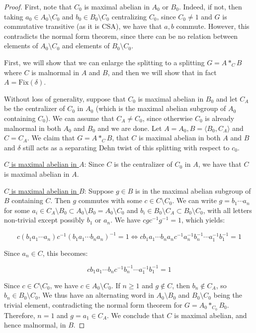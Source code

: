 \documentclass{amsart}
\newcommand{\vs}{\vspace{10pt}}
\theoremstyle{plain}
\theoremstyle{definition}
\theoremstyle{remark}
\begin{document}
\begin{proof}
    First, note that $C_0$ is maximal abelian in $A_0$ or $B_0$. Indeed, if not, then taking $a_0 \in A_0 \setminus C_0$ and $b_0 \in B_0 \setminus C_0$ centralizing $C_0$, since $C_0 \neq 1$ and $G$ is commutative transitive (as it is CSA), we have that $a,b$ commute. However, this contradicts the normal form theorem, since there can be no relation between elements of $A_0 \setminus C_0$ and elements of $B_0 \setminus C_0$. 

    First, we will show that we can enlarge the splitting to a splitting $G = A *_C B$ where $C$ is malnormal in $A$ and $B$, and then we will show that in fact $A = \mathrm{Fix}(\delta)$. 

    Without loss of generality, suppose that $C_0$ is maximal abelian in $B_0$ and let $C_A$ be the centralizer of $C_0$ in $A_0$ (which is the maximal abelian subgroup of $A_0$ containing $C_0$). We can assume that $C_A \neq C_0$, since otherwise $C_0$ is already malnormal in both $A_0$ and $B_0$ and we are done. Let $A = A_0, B = \langle B_0, C_A \rangle$ and $C = C_A$. We claim that $G = A *_C B$, that $C$ is maximal abelian in both $A$ and $B$ and $\delta$ still acts as a separating Dehn twist of this splitting with respect to $c_0$. 

\vs

\underline{$C$ is maximal abelian in $A$}: Since $C$ is the centralizer of $C_0$ in $A$, we have that $C$ is maximal abelian in $A$.

\vs

\underline{$C$ is maximal abelian in $B$}: Suppose $g \in B$ is in the maximal abelian subgroup of $B$ containing $C$. Then $g$ commutes with some $c \in C \setminus C_0$. We can write $g = b_1 \cdots a_n$ for some $a_i \in C_A \setminus B_0 \subset A_0 \setminus B_0 = A_0 \setminus C_0$ and $b_i \in B_0 \setminus C_A \subset B_0 \setminus C_0$, with all letters non-trivial except possibly $b_1$ or $a_n$. We have $cgc^{-1}g^{-1} = 1$, which yields: 

$$ c (b_1 a_1 \cdots a_n) c^{-1} (b_1 a_1 \cdots b_n a_n)^{-1} = 1 \iff c b_1 a_1 \cdots b_n a_n c^{-1}a_n^{-1} b_n^{-1} \cdots a_1^{-1} b_1^{-1} = 1$$

Since $a_n \in C$, this becomes: 


$$ c b_1 a_1 \cdots b_n c^{-1} b_n^{-1} \cdots a_1^{-1} b_1^{-1} = 1$$

Since $c \in C \setminus C_0$, we have $c \in A_0 \setminus C_0$. If $n \geq 1$ and $g \notin C$, then $b_n \notin C_A$, so $b_n \in B_0 \setminus C_0$, We thus have an alternating word in $A_0 \setminus B_0$ and $B_0 \setminus C_0$ being the trivial element, contradicting the normal form theorem for $G = A_0 *_{C_0} B_0$. Therefore, $n = 1$ and $g = a_1 \in C_A$. We conclude that $C$ is maximal abelian, and hence malnormal, in $B$.


\end{proof}
\end{document}
